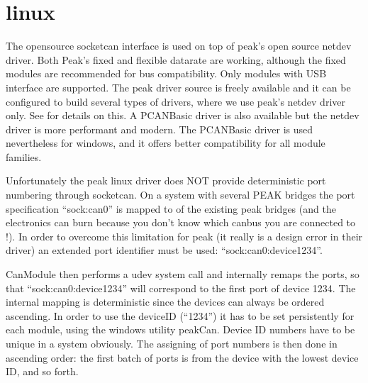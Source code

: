 \documentclass[a4paper,10pt,english]{sphinxmanual}
\begin{document}
\section{linux}
\label{\detokenize{vendors/peak:linux}}
The open\sphinxhyphen{}source socketcan interface is used on top of peak’s open source netdev driver. Both Peak’s
fixed and flexible datarate are working, although the fixed modules are recommended for bus compatibility.
Only modules with USB interface are supported.
The peak driver source is freely available and it can be configured to build several
types of drivers, where we use peak’s netdev driver only. See  for details on this.
A PCAN\sphinxhyphen{}Basic driver is also available but the netdev driver is more performant and modern. The
PCAN\sphinxhyphen{}Basic driver is used nevertheless for windows, and it offers better compatibility for all module
families.

Unfortunately the peak linux driver does NOT provide deterministic port numbering through socketcan. On a
system with several PEAK bridges the port specification “sock:can0” is mapped to 
of the existing peak bridges (and the electronics can burn because you don’t know which
can\sphinxhyphen{}bus you are connected to !). In order to overcome this limitation for peak
(it really is a design error in their driver) an extended port identifier must be used: “sock:can0:device1234”.

CanModule then performs a udev system call and internally remaps the ports, so that “sock:can0:device1234”
will correspond to the first port of device 1234. The internal mapping is deterministic since the devices
can always be ordered ascending.
In order to use the deviceID (“1234”) it has to be set persistently for each module, using the windows
utility peakCan. Device ID numbers have to be unique in a system obviously. The assigning of port numbers
is then done in ascending order: the first batch of ports is from the device with the lowest device ID,
and so forth.
\end{document}
